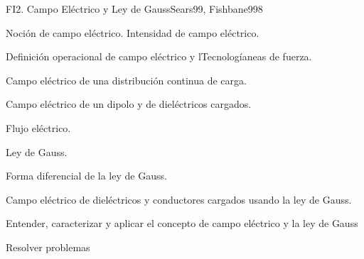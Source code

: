 \begin{syllabus}
\begin{unit}{FI2. Campo Eléctrico y Ley de Gauss}{Sears99, Fishbane99}{8}
   \begin{topics}
         \item  Noción de campo eléctrico.  Intensidad de campo eléctrico.
	 \item  Definición operacional de campo eléctrico y lTecnologíaneas de fuerza.
         \item  Campo eléctrico de una distribución continua de carga.
	 \item  Campo eléctrico de un dipolo y de dieléctricos cargados.
         \item  Flujo eléctrico.
	 \item  Ley de Gauss.
         \item  Forma diferencial de la ley de Gauss.
	 \item  Campo eléctrico de dieléctricos y conductores cargados usando la ley de Gauss.
   \end{topics}

   \begin{unitgoals}
         \item  Entender, caracterizar y aplicar el concepto de campo eléctrico y la ley de Gauss
         \item  Resolver problemas
   \end{unitgoals}
\end{unit}


\end{syllabus}
